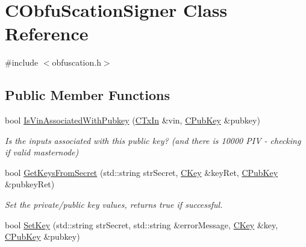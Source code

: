 \hypertarget{class_c_obfu_scation_signer}{}\section{C\+Obfu\+Scation\+Signer Class Reference}
\label{class_c_obfu_scation_signer}


{\ttfamily \#include $<$obfuscation.\+h$>$}

\subsection*{Public Member Functions}
\begin{DoxyCompactItemize}
\item 
\mbox{\label{class_c_obfu_scation_signer_ae52356535949db63ac24a3815c0ca117}} 
bool \mbox{\hyperlink{class_c_obfu_scation_signer_ae52356535949db63ac24a3815c0ca117}{Is\+Vin\+Associated\+With\+Pubkey}} (\mbox{\hyperlink{class_c_tx_in}{C\+Tx\+In}} \&vin, \mbox{\hyperlink{class_c_pub_key}{C\+Pub\+Key}} \&pubkey)
\begin{DoxyCompactList}\small\item\em Is the inputs associated with this public key? (and there is 10000 P\+IV -\/ checking if valid masternode) \end{DoxyCompactList}\item 
\mbox{\label{class_c_obfu_scation_signer_a1e649a4b0bbeb5921ce2c37a240a98ae}} 
bool \mbox{\hyperlink{class_c_obfu_scation_signer_a1e649a4b0bbeb5921ce2c37a240a98ae}{Get\+Keys\+From\+Secret}} (std\+::string str\+Secret, \mbox{\hyperlink{class_c_key}{C\+Key}} \&key\+Ret, \mbox{\hyperlink{class_c_pub_key}{C\+Pub\+Key}} \&pubkey\+Ret)
\begin{DoxyCompactList}\small\item\em Set the private/public key values, returns true if successful. \end{DoxyCompactList}\item 
\mbox{\label{class_c_obfu_scation_signer_a4a12e41611db1b711d59ac4c3323dd36}} 
bool \mbox{\hyperlink{class_c_obfu_scation_signer_a4a12e41611db1b711d59ac4c3323dd36}{Set\+Key}} (std\+::string str\+Secret, std\+::string \&error\+Message, \mbox{\hyperlink{class_c_key}{C\+Key}} \&key, \mbox{\hyperlink{class_c_pub_key}{C\+Pub\+Key}} \&pubkey)

\end{DoxyCompactItemize}
